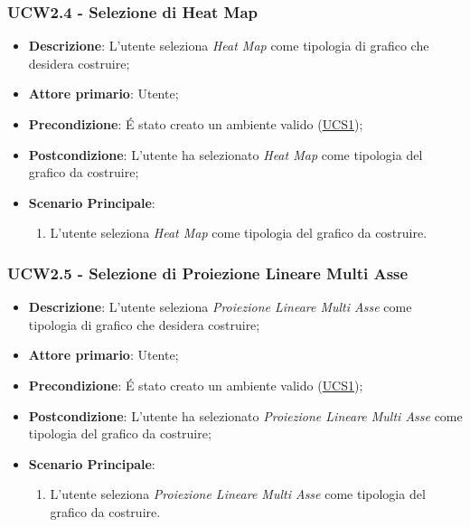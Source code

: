 \subsubsection{UCW2.4 - Selezione di Heat Map}
\label{ssub:ucw2.4}
\begin{itemize}

	\item \textbf{Descrizione}: L’utente seleziona \emph{Heat Map} come tipologia di grafico che desidera 
	costruire;

    \item \textbf{Attore primario}: Utente;

	\item \textbf{Precondizione}:   É stato creato un ambiente valido (\hyperref[sub:ucs1]{UCS1});

    \item \textbf{Postcondizione}:  L'utente ha selezionato \emph{Heat Map} come tipologia del grafico da 
	costruire;

	\item \textbf{Scenario Principale}: 
	\begin{enumerate}
		\item L'utente seleziona \emph{Heat Map} come tipologia del grafico da costruire.
	\end{enumerate}

\end{itemize}


\subsubsection{UCW2.5 - Selezione di Proiezione Lineare Multi Asse}
\label{ssub:ucw2.5}
\begin{itemize}

	\item \textbf{Descrizione}: L’utente seleziona \emph{Proiezione Lineare Multi Asse} come tipologia di grafico che 
	desidera costruire;

    \item \textbf{Attore primario}: Utente;

    \item \textbf{Precondizione}:   É stato creato un ambiente valido (\hyperref[sub:ucs1]{UCS1});

	\item \textbf{Postcondizione}:  L'utente ha selezionato \emph{Proiezione Lineare Multi Asse} come tipologia del 
	grafico da costruire;
	
	\item \textbf{Scenario Principale}: 
	\begin{enumerate}
		\item L'utente seleziona \emph{Proiezione Lineare Multi Asse} come tipologia del grafico da costruire.
	\end{enumerate}
\end{itemize}

